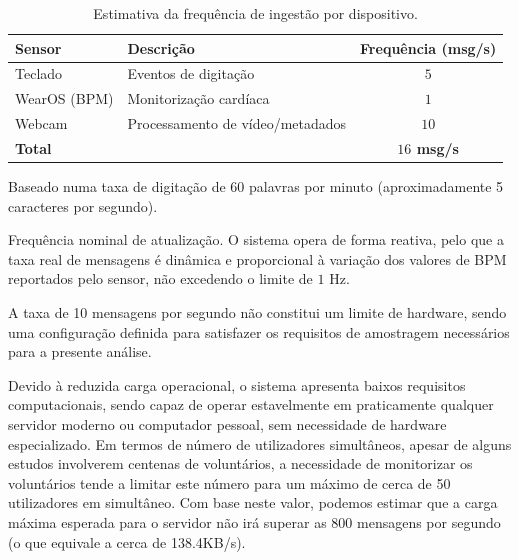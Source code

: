 \begin{table}[h]
\centering
\begin{threeparttable}
\caption{Estimativa da frequência de ingestão por dispositivo.}
\label{tab:sensor_throughput}
\begin{tabular}{llc}
\toprule
\textbf{Sensor} & \textbf{Descrição} & \textbf{Frequência (msg/s)} \\ 
\midrule
Teclado\tnote{1} & Eventos de digitação & $5$ \\
WearOS (\ac{BPM})\tnote{2} & Monitorização cardíaca & $1$ \\
Webcam\tnote{3} & Processamento de vídeo/metadados & $10$ \\ 
\midrule
\textbf{Total} & & \textbf{$16$ msg/s} \\ 
\bottomrule
\end{tabular}
\begin{tablenotes}
    \small
    \item[1] Baseado numa taxa de digitação de 60 palavras por minuto (aproximadamente 5 caracteres por segundo).
    \item[2] Frequência nominal de atualização. O sistema opera de forma reativa, pelo que a taxa real de mensagens é dinâmica e proporcional à variação dos valores de \ac{BPM} reportados pelo sensor, não excedendo o limite de $1$ Hz.
    \item[3] A taxa de 10 mensagens por segundo não constitui um limite de hardware, sendo uma configuração definida para satisfazer os requisitos de amostragem necessários para a presente análise.
\end{tablenotes}
\end{threeparttable}
\end{table}

Devido à reduzida carga operacional, o sistema apresenta baixos requisitos computacionais, sendo capaz de operar estavelmente em praticamente qualquer servidor moderno ou computador pessoal, sem necessidade de hardware especializado.
Em termos de número de utilizadores simultâneos, apesar de alguns estudos involverem centenas de voluntários, a necessidade de monitorizar os voluntários tende a limitar este número para um máximo de cerca de 50 utilizadores em simultâneo. Com base neste valor, podemos estimar que a carga máxima esperada para o servidor não irá superar as 800 mensagens por segundo (o que equivale a cerca de 138.4KB/s). 